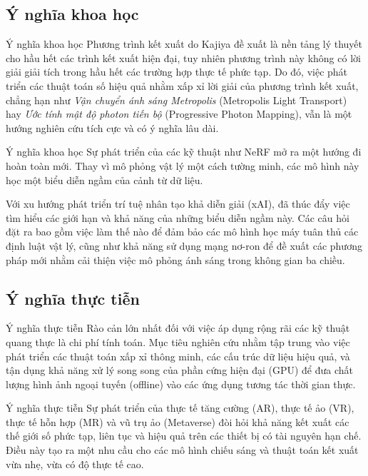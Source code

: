 \documentclass[11pt, aspectratio=169]{beamer}
\begin{document}
\subsection{Ý nghĩa khoa học}
\begin{frame}{Ý nghĩa khoa học}
	Phương trình kết xuất do Kajiya đề xuất là nền tảng lý thuyết cho hầu hết các trình kết xuất hiện đại, tuy nhiên phương trình này không có lời giải giải tích trong hầu hết các trường hợp thực tế phức tạp. Do đó, việc phát triển các thuật toán số hiệu quả nhằm xấp xỉ lời giải của phương trình kết xuất, chẳng hạn như \textit{Vận chuyển ánh sáng Metropolis} (Metropolis Light Transport) hay \textit{Ước tính mật độ photon tiến bộ} (Progressive Photon Mapping), vẫn là một hướng nghiên cứu tích cực và có ý nghĩa lâu dài.
\end{frame}

\begin{frame}{Ý nghĩa khoa học}
	Sự phát triển của các kỹ thuật như NeRF mở ra một hướng đi hoàn toàn mới. Thay vì mô phỏng vật lý một cách tường minh, các mô hình này học một biểu diễn ngầm của cảnh từ dữ liệu. 
	
	Với xu hướng phát triển trí tuệ nhân tạo khả diễn giải (xAI), đã thúc đẩy việc tìm hiểu các giới hạn và khả năng của những biểu diễn ngầm này. Các câu hỏi đặt ra bao gồm việc làm thế nào để đảm bảo các mô hình học máy tuân thủ các định luật vật lý, cũng như khả năng sử dụng mạng nơ-ron để đề xuất các phương pháp mới nhằm cải thiện việc mô phỏng ánh sáng trong không gian ba chiều.
\end{frame}

\subsection{Ý nghĩa thực tiễn}
\begin{frame}{Ý nghĩa thực tiễn}
	Rào cản lớn nhất đối với việc áp dụng rộng rãi các kỹ thuật quang thực là chi phí tính toán. Mục tiêu nghiên cứu nhằm tập trung vào việc phát triển các thuật toán xấp xỉ thông minh, các cấu trúc dữ liệu hiệu quả, và tận dụng khả năng xử lý song song của phần cứng hiện đại (GPU) để đưa chất lượng hình ảnh ngoại tuyến (offline) vào các ứng dụng tương tác thời gian thực.
\end{frame}

\begin{frame}{Ý nghĩa thực tiễn}
	Sự phát triển của thực tế tăng cường (AR), thực tế ảo (VR), thực tế hỗn hợp (MR) và vũ trụ ảo (Metaverse) đòi hỏi khả năng kết xuất các thế giới số phức tạp, liên tục và hiệu quả trên các thiết bị có tài nguyên hạn chế. Điều này tạo ra một nhu cầu cho các mô hình chiếu sáng và thuật toán kết xuất vừa nhẹ, vừa có độ thực tế cao.
\end{frame}
\end{document}
